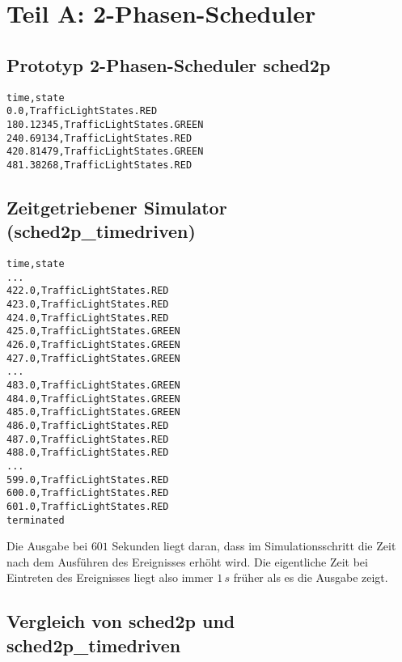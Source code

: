 \documentclass[11pt, a4paper]{article}
\begin{document}


\section{Teil A: 2-Phasen-Scheduler}

\subsection{Prototyp 2-Phasen-Scheduler sched2p}


\begin{lstlisting}[title={Ausgabe sched2p bei Simulationszeit von 10 Minuten}]
time,state
0.0,TrafficLightStates.RED
180.12345,TrafficLightStates.GREEN
240.69134,TrafficLightStates.RED
420.81479,TrafficLightStates.GREEN
481.38268,TrafficLightStates.RED
\end{lstlisting}

\subsection{Zeitgetriebener Simulator (sched2p\_timedriven)}


\begin{lstlisting}[title={Teil der Ausgabe sched2p\_timedriven bei Simulationszeit von 10 Minuten. Schrittweite = $1\,\si{\second}$}]
time,state
...
422.0,TrafficLightStates.RED
423.0,TrafficLightStates.RED
424.0,TrafficLightStates.RED
425.0,TrafficLightStates.GREEN
426.0,TrafficLightStates.GREEN
427.0,TrafficLightStates.GREEN
...
483.0,TrafficLightStates.GREEN
484.0,TrafficLightStates.GREEN
485.0,TrafficLightStates.GREEN
486.0,TrafficLightStates.RED
487.0,TrafficLightStates.RED
488.0,TrafficLightStates.RED
...
599.0,TrafficLightStates.RED
600.0,TrafficLightStates.RED
601.0,TrafficLightStates.RED
terminated
\end{lstlisting}

Die Ausgabe bei $601$ Sekunden liegt daran, dass im Simulationsschritt die Zeit nach dem Ausführen des Ereignisses erhöht wird. Die eigentliche Zeit bei Eintreten des Ereignisses liegt also immer $1\,\si{s}$ früher als es die Ausgabe zeigt.


\subsection{Vergleich von sched2p und sched2p\_timedriven}
\end{document}
